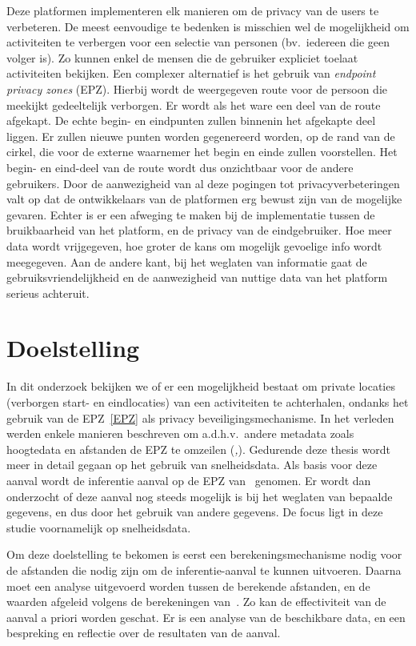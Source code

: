 Deze platformen implementeren elk manieren om de privacy van de users te
verbeteren. De meest eenvoudige te bedenken is misschien wel de mogelijkheid om
activiteiten te verbergen voor een selectie van personen (bv.\ iedereen die
geen volger is). Zo kunnen enkel de mensen die de gebruiker expliciet toelaat
activiteiten bekijken. Een complexer alternatief is het gebruik van
\textit{endpoint privacy zones} (EPZ). Hierbij wordt de weergegeven route voor
de persoon die meekijkt gedeeltelijk verborgen. Er wordt als het ware een deel
van de route afgekapt. De echte begin- en eindpunten zullen binnenin het
afgekapte deel liggen. Er zullen nieuwe punten worden gegenereerd worden, op de
rand van de cirkel, die voor de externe waarnemer het begin en einde zullen
voorstellen. Het begin- en eind-deel van de route wordt dus onzichtbaar voor de
andere gebruikers. Door de aanwezigheid van al deze pogingen tot
privacyverbeteringen valt op dat de ontwikkelaars van de platformen erg bewust
zijn van de mogelijke gevaren. Echter is er een afweging te maken bij de
implementatie tussen de bruikbaarheid van het platform, en de privacy van de
eindgebruiker. Hoe meer data wordt vrijgegeven, hoe groter de kans om mogelijk
gevoelige info wordt meegegeven. Aan de andere kant, bij het weglaten van
informatie gaat de gebruiksvriendelijkheid en de aanwezigheid van nuttige data
van het platform serieus achteruit.

\section{Doelstelling}
In dit onderzoek bekijken we of er een mogelijkheid bestaat om private locaties
(verborgen start- en eindlocaties) van een activiteiten te achterhalen, ondanks
het gebruik van de EPZ~\ref{EPZ} als privacy beveiligingsmechanisme. In het
verleden werden enkele manieren beschreven om a.d.h.v.\ andere metadata zoals
hoogtedata en afstanden de EPZ te omzeilen
(\textit{\cite{Dhondt_Pochat_Voulimeneas_Joosen_Volckaert_2022},\cite{Verdonck_2022}}).
Gedurende deze thesis wordt meer in detail gegaan op het gebruik van
snelheidsdata. Als basis voor deze aanval wordt de inferentie aanval op de EPZ
van~\citeauthor{Dhondt_Pochat_Voulimeneas_Joosen_Volckaert_2022} genomen. Er
wordt dan onderzocht of deze aanval nog steeds mogelijk is bij het weglaten van
bepaalde gegevens, en dus door het gebruik van andere gegevens. De focus ligt
in deze studie voornamelijk op snelheidsdata.

Om deze doelstelling te bekomen is eerst een berekeningsmechanisme nodig voor
de afstanden die nodig zijn om de inferentie-aanval te kunnen uitvoeren. Daarna
moet een analyse uitgevoerd worden tussen de berekende afstanden, en de waarden
afgeleid volgens de berekeningen
van~\citeauthor{Dhondt_Pochat_Voulimeneas_Joosen_Volckaert_2022}. Zo kan de
effectiviteit van de aanval a priori worden geschat. Er is een analyse van de
beschikbare data, en een bespreking en reflectie over de resultaten van de
aanval.

